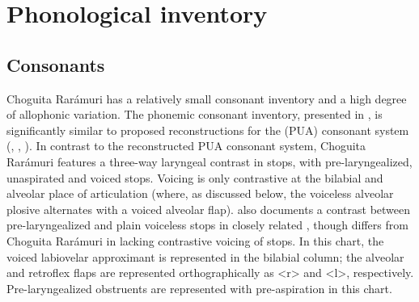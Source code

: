 

\section{Phonological inventory}
\label{sec: phonological inventory}
\largerpage
\subsection{Consonants}
\label{subsec: consonants}

Choguita Rarámuri has a relatively small consonant inventory and a high degree of allophonic variation. The phonemic consonant inventory, presented in , is significantly similar to proposed reconstructions for the  (PUA) consonant system (\citealt{voegelin17voegelin}, \citealt{miller1967uto}, \citealt{langacker1977uto}). In contrast to the reconstructed PUA consonant system, Choguita Rarámuri features a three-way laryngeal contrast in stops, with pre-laryngealized, unaspirated and voiced stops. Voicing is only contrastive at the bilabial and alveolar place of articulation (where, as discussed below, the voiceless alveolar plosive alternates with a voiced alveolar flap). \citet{miller1996guarijio} also documents a contrast between pre-laryngealized and plain voiceless stops in closely related , though  differs from Choguita Rarámuri in lacking contrastive voicing of stops. In this chart, the voiced labiovelar approximant is represented in the bilabial column; the alveolar and retroflex flaps are represented orthographically as <r> and <l>, respectively. Pre-laryngealized obstruents are represented with pre-aspiration in this chart.


